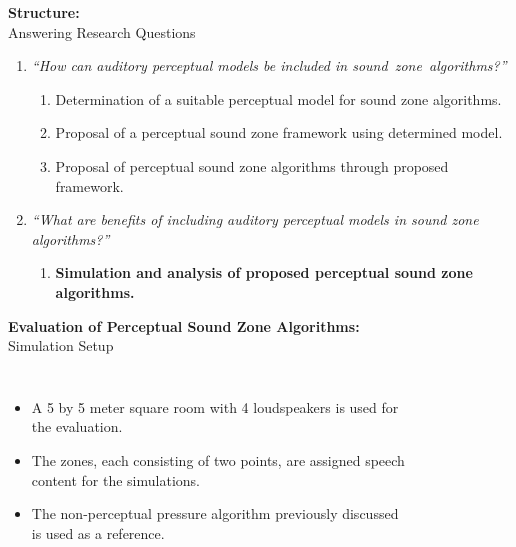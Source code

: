 \documentclass[aspectratio=169]{beamer}
\begin{document}
\begin{frame}{\textbf{Structure:}\\ Answering Research Questions}
    \begin{enumerate}
        \item {\textit{``How can auditory perceptual models be included in sound~zone~algorithms?''}}
            \vspace{7pt}
            \begin{enumerate}
                \item Determination of a suitable perceptual model for sound zone algorithms.
                \vspace{7pt}
                \item Proposal of a perceptual sound zone framework using determined model. 
                \vspace{7pt}
                \item Proposal of perceptual sound zone algorithms through proposed framework.
                \vspace{7pt}
            \end{enumerate}
        \item {\textit{``What are benefits of including auditory perceptual models in sound zone algorithms?''}}
            \vspace{-5pt}
            \begin{enumerate}
                \item \textbf{Simulation and analysis of proposed perceptual sound zone algorithms.}
            \end{enumerate}
    \end{enumerate}
\end{frame}

\begin{frame}{\textbf{Evaluation of Perceptual Sound Zone Algorithms:}\\ Simulation Setup}
    \begin{columns}[c]
        \begin{itemize}
            \item A 5 by 5 meter square room with 4 loudspeakers is used for the evaluation.
            \item The zones, each consisting of two points, are assigned speech content for the simulations.
            \item The non-perceptual pressure algorithm previously discussed is used as a reference.
        \end{itemize}
        \begin{figure}[]
            \centering
            \scalebox{0.7}{}
        \end{figure}
    \end{columns}
\end{frame}
\end{document}
